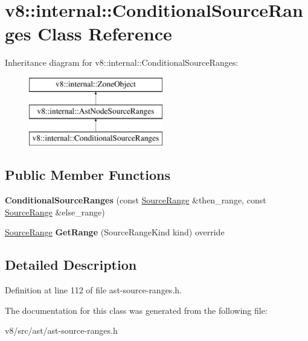 \hypertarget{classv8_1_1internal_1_1ConditionalSourceRanges}{}\section{v8\+:\+:internal\+:\+:Conditional\+Source\+Ranges Class Reference}
\label{classv8_1_1internal_1_1ConditionalSourceRanges}
Inheritance diagram for v8\+:\+:internal\+:\+:Conditional\+Source\+Ranges\+:\begin{figure}[H]
\begin{center}
\leavevmode
\includegraphics[height=3.000000cm]{classv8_1_1internal_1_1ConditionalSourceRanges}
\end{center}
\end{figure}
\subsection*{Public Member Functions}
\begin{DoxyCompactItemize}
\item 
\mbox{\label{classv8_1_1internal_1_1ConditionalSourceRanges_ab1e0855bf8caf01cc60512b880aed8c2}} 
{\bfseries Conditional\+Source\+Ranges} (const \mbox{\hyperlink{structv8_1_1internal_1_1SourceRange}{Source\+Range}} \&then\+\_\+range, const \mbox{\hyperlink{structv8_1_1internal_1_1SourceRange}{Source\+Range}} \&else\+\_\+range)
\item 
\mbox{\label{classv8_1_1internal_1_1ConditionalSourceRanges_a780dd0f76dac75d08e1c8d58c05bbde4}} 
\mbox{\hyperlink{structv8_1_1internal_1_1SourceRange}{Source\+Range}} {\bfseries Get\+Range} (Source\+Range\+Kind kind) override
\end{DoxyCompactItemize}


\subsection{Detailed Description}


Definition at line 112 of file ast-\/source-\/ranges.\+h.



The documentation for this class was generated from the following file\+:\begin{DoxyCompactItemize}
\item 
v8/src/ast/ast-\/source-\/ranges.\+h\end{DoxyCompactItemize}

